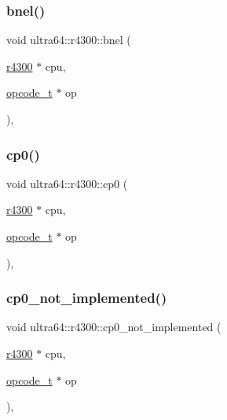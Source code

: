 \mbox{\label{classultra64_1_1r4300_acfe0ea0b8feeaa51e31cb666f204646b}} 
\subsubsection{\texorpdfstring{bnel()}{bnel()}}
{\footnotesize\ttfamily void ultra64\+::r4300\+::bnel (\begin{DoxyParamCaption}\item[{\hyperlink{classultra64_1_1r4300}{r4300} $\ast$}]{cpu,  }\item[{\hyperlink{classultra64_1_1opcode__t}{opcode\+\_\+t} $\ast$}]{op }\end{DoxyParamCaption})\hspace{0.3cm}{\ttfamily [static]}, {\ttfamily [private]}}

\mbox{\label{classultra64_1_1r4300_aa5eb004d0ce043c3ab85fb59b28fb4aa}} 
\subsubsection{\texorpdfstring{cp0()}{cp0()}}
{\footnotesize\ttfamily void ultra64\+::r4300\+::cp0 (\begin{DoxyParamCaption}\item[{\hyperlink{classultra64_1_1r4300}{r4300} $\ast$}]{cpu,  }\item[{\hyperlink{classultra64_1_1opcode__t}{opcode\+\_\+t} $\ast$}]{op }\end{DoxyParamCaption})\hspace{0.3cm}{\ttfamily [static]}, {\ttfamily [private]}}

\mbox{\label{classultra64_1_1r4300_a703fdd21f221dbc7524a444380dc6103}} 
\subsubsection{\texorpdfstring{cp0\+\_\+not\+\_\+implemented()}{cp0\_not\_implemented()}}
{\footnotesize\ttfamily void ultra64\+::r4300\+::cp0\+\_\+not\+\_\+implemented (\begin{DoxyParamCaption}\item[{\hyperlink{classultra64_1_1r4300}{r4300} $\ast$}]{cpu,  }\item[{\hyperlink{classultra64_1_1opcode__t}{opcode\+\_\+t} $\ast$}]{op }\end{DoxyParamCaption})\hspace{0.3cm}{\ttfamily [static]}, {\ttfamily [private]}}

